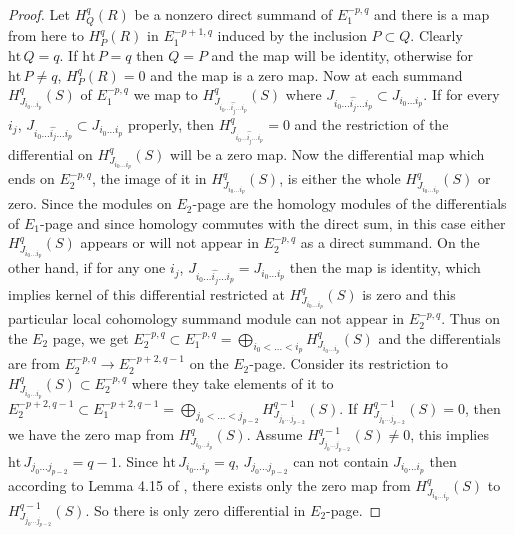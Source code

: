 \documentclass[10pt]{amsart}
\theoremstyle{plain}
\theoremstyle{definition}
\newcommand{\func}[1]{\mathrm{#1} \,}
\newcommand{\height}{\func{ht}}
\begin{document}
\begin{proof}
Let $H^q_Q (R)$ be a nonzero direct summand of $E_1^{-p,q}$ and there is a map from here to $H^q_P (R)$ in $E_1^{-p+1,q}$ induced by the inclusion $P\subset Q$. Clearly $\height Q=q$. If $\height P=q$ then $Q=P$ and the map will be identity, otherwise for $\height P\neq q$, $H^q_P (R)=0$ and the map is a zero map. Now at each summand $H^q_{J_{i_0\ldots i_p}}(S)$ of $E_1^{-p,q}$ we map to $H^q_{J_{i_0\ldots\widehat{i_j}\ldots i_p}}(S)$ where $J_{i_0\ldots\widehat{i_j}\ldots i_p}\subset J_{i_0\ldots i_p}$. If for every $i_j$, $J_{i_0\ldots\widehat{i_j}\ldots i_p}\subset J_{i_0\ldots i_p}$ properly, then $H^q_{J_{i_0\ldots\widehat{i_j}\ldots i_p}}=0$ and the restriction of the differential on $H^q_{J_{i_0\ldots i_p}}(S)$ will be a zero map. Now the differential map which ends on $E_2^{-p,q}$, the image of it in $H^q_{J_{i_0\ldots i_p}}(S)$, is either the whole $H^q_{J_{i_0\ldots i_p}}(S)$ or zero. Since the modules on $E_2$-page are the homology modules of the differentials of $E_1$-page and since homology commutes with the direct sum, in this case either $H^q_{J_{i_0\ldots i_p}}(S)$ appears or will not appear in $E_2^{-p,q}$ as a direct summand. On the other hand, if for any one $i_j$, $J_{i_0\ldots\widehat{i_j}\ldots i_p}= J_{i_0\ldots i_p}$ then the map is identity, which implies kernel of this differential restricted at $H^q_{J_{i_0\ldots i_p}}(S)$ is zero and this particular local cohomology summand module can not appear in $E_2^{-p,q}$. Thus on the $E_2$ page, we get $E_2^{-p,q}\subset E_1^{-p,q}=\bigoplus_{i_0<\dots<i_p}H^q_{J_{i_0\ldots i_p}}(S)$ and the differentials are from $E_2^{-p,q}\to E_2^{-p+2,q-1}$ on the $E_2$-page. Consider its restriction to $H^q_{J_{i_0\ldots i_p}}(S)\subset E_2^{-p,q}$ where they take elements of it to $E_2^{-p+2,q-1}\subset E_1^{-p+2,q-1}= \bigoplus_{j_0<\dots<j_{p-2}}H^{q-1}_{J_{j_0\ldots j_{p-2}}}(S)$. If $H^{q-1}_{J_{j_0\ldots j_{p-2}}}(S)= 0$, then we have the zero map from $H^q_{J_{i_0\ldots i_p}}(S)$. Assume $H^{q-1}_{J_{j_0\ldots j_{p-2}}}(S)\neq 0$, this implies $\height J_{j_0\ldots j_{p-2}}= q-1$. Since $\height J_{i_0\ldots i_p}= q$, $J_{j_0\ldots j_{p-2}}$ can not contain $J_{i_0\ldots i_p}$ then according to Lemma 4.15 of \cite{ABZ}, there exists only the zero map from $H^q_{J_{i_0\ldots i_p}}(S)$ to $H^{q-1}_{J_{j_0\ldots j_{p-2}}}(S)$. So there is only zero differential in $E_2$-page.  
 

\end{proof}
\end{document}
